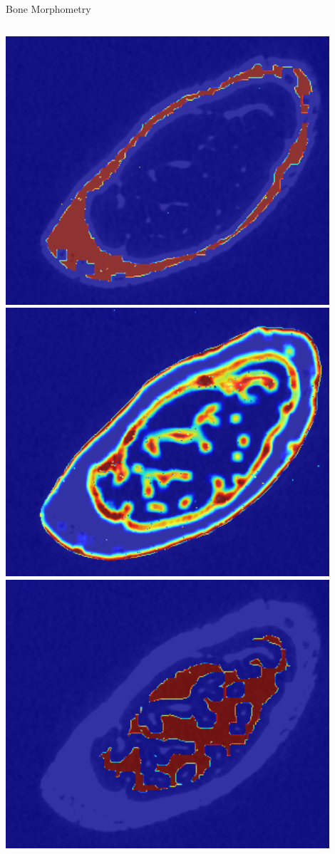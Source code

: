 \documentclass[10pt,aspectratio=169]{beamer}
\begin{document}
\begin{frame}{Bone Morphometry}
\begin{columns}[onlytextwidth]
\begin{columns}
    \includegraphics[width=0.9\textwidth]{./TextureMapsImages/BM_49_LEFT_2_crop.png}
    \centering
    \includegraphics[width=0.9\textwidth]{./TextureMapsImages/BM_49_LEFT_1_crop.png}\\
    \includegraphics[width=0.9\textwidth]{./TextureMapsImages/BM_49_LEFT_3_crop.png}

\end{columns}
\end{columns}
\end{frame}
\end{document}
